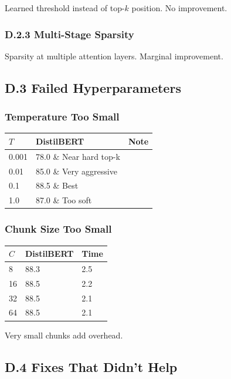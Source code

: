 Learned threshold instead of top-$k$ position. No improvement.

\subsubsection{D.2.3 Multi-Stage Sparsity}

Sparsity at multiple attention layers. Marginal improvement.

\subsection{D.3 Failed Hyperparameters}

\subsubsection{Temperature Too Small}
\begin{table}[H]
\centering
\small
\begin{tabular}{lll}
\toprule
\textbf{$T$} & \textbf{DistilBERT} & \textbf{Note} \\
\midrule
0.001 & 78.0 \& Near hard top-k \\
0.01 & 85.0 \& Very aggressive \\
0.1 & 88.5 \& Best \\
1.0 & 87.0 \& Too soft \\
\bottomrule
\end{tabular}
\end{table}

\subsubsection{Chunk Size Too Small}
\begin{table}[H]
\centering
\small
\begin{tabular}{lll}
\toprule
\textbf{$C$} & \textbf{DistilBERT} & \textbf{Time} \\
\midrule
8 & 88.3 & 2.5 \\
16 & 88.5 & 2.2 \\
32 & 88.5 & 2.1 \\
64 & 88.5 & 2.1 \\
\bottomrule
\end{tabular}
\end{table}

Very small chunks add overhead.

\subsection{D.4 Fixes That Didn't Help}

